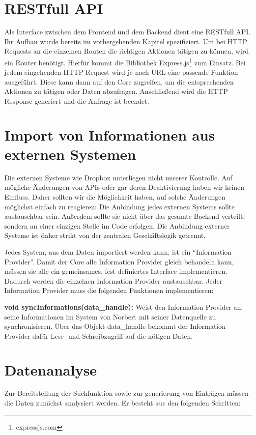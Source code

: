 	\section{RESTfull API} %
	\label{sec:restfull_api}
		Als Interface zwischen dem Frontend und dem Backend dient eine RESTfull API. Ihr Aufbau wurde bereits im vorhergehenden Kapitel spezifiziert. Um bei HTTP Requests an die einzelnen Routen die richtigen Aktionen tätigen zu können, wird ein Router benötigt. Hierfür kommt die Bibliothek Express.js\footnote{expressjs.com} zum Einsatz. Bei jedem eingehenden HTTP Request wird je nach URL eine passende Funktion ausgeführt. Diese kann dann auf den Core zugreifen, um die entsprechenden Aktionen zu tätigen oder Daten abzufragen. Anschließend wird die HTTP Response generiert und die Anfrage ist beendet.

	\section{Import von Informationen aus externen Systemen} %
	\label{sec:import_von_informationen_aus_externen_systemen}
		Die externen Systeme wie Dropbox unterliegen nicht unserer Kontrolle. Auf mögliche Änderungen von APIs oder gar deren Deaktivierung haben wir keinen Einfluss. Daher sollten wir die Möglichkeit haben, auf solche Änderungen möglichst einfach zu reagieren: Die Anbindung jedes externen Systems sollte austauschbar sein. Außerdem sollte sie nicht über das gesamte Backend verteilt, sondern an einer einzigen Stelle im Code erfolgen. Die Anbindung externer Systeme ist daher strikt von der zentralen Geschäftslogik getrennt.

		Jedes System, aus dem Daten importiert werden kann, ist ein \enquote{Information Provider}. Damit der Core alle Information Provider gleich behandeln kann, müssen sie alle ein gemeinsames, fest definiertes Interface implementieren. Dadurch werden die einzelnen Information Provider austauschbar. Jeder Information Provider muss die folgenden Funktionen implementieren:

		\textbf{void syncInformations(data\_handle): } Weist den Information Provider an, seine Informationen im System von Norbert mit seiner Datenquelle zu synchronisieren. Über das Objekt data\_handle bekommt der Information Provider dafür Lese- und Schreibzugriff auf die nötigen Daten.
		 
	\section{Datenanalyse} %
	\label{sec:datenanalyse}
		Zur Bereitstellung der Suchfunktion sowie zur generierung von Einträgen müssen die Daten zunächst analysiert werden. Er besteht aus den folgenden Schritten:

